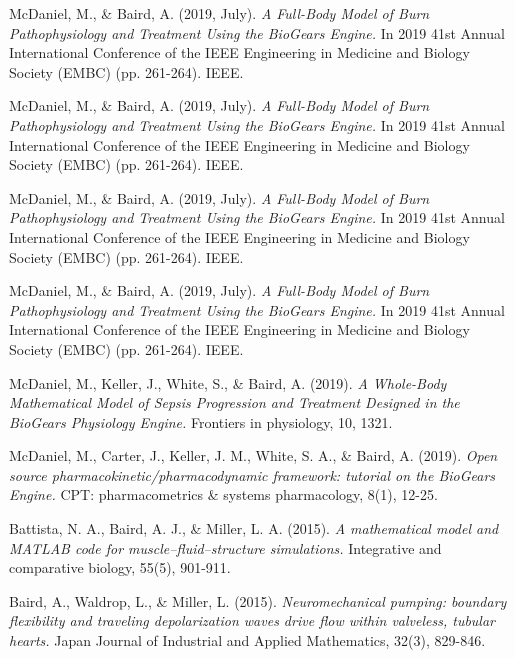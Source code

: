 
\begin{cventries}
  \cventry
    {} %
    {} %
    {} %
    {} %
    {
      \begin{cvitems} %
        \item {McDaniel, M., \& Baird, A. (2019, July). \textit{A Full-Body Model of Burn Pathophysiology and Treatment Using the BioGears Engine.} In 2019 41st Annual International Conference of the IEEE Engineering in Medicine and Biology Society (EMBC) (pp. 261-264). IEEE.}
        \item {McDaniel, M., \& Baird, A. (2019, July). \textit{A Full-Body Model of Burn Pathophysiology and Treatment Using the BioGears Engine.} In 2019 41st Annual International Conference of the IEEE Engineering in Medicine and Biology Society (EMBC) (pp. 261-264). IEEE.}
        \item {McDaniel, M., \& Baird, A. (2019, July). \textit{A Full-Body Model of Burn Pathophysiology and Treatment Using the BioGears Engine.} In 2019 41st Annual International Conference of the IEEE Engineering in Medicine and Biology Society (EMBC) (pp. 261-264). IEEE.}
        \item {McDaniel, M., \& Baird, A. (2019, July). \textit{A Full-Body Model of Burn Pathophysiology and Treatment Using the BioGears Engine.} In 2019 41st Annual International Conference of the IEEE Engineering in Medicine and Biology Society (EMBC) (pp. 261-264). IEEE.}
        \item {McDaniel, M., Keller, J., White, S., \& Baird, A. (2019). \textit{A Whole-Body Mathematical Model of Sepsis Progression and Treatment Designed in the BioGears Physiology Engine.} Frontiers in physiology, 10, 1321.}
        \item{McDaniel, M., Carter, J., Keller, J. M., White, S. A., \& Baird, A. (2019). \textit{Open source pharmacokinetic/pharmacodynamic framework: tutorial on the BioGears Engine.} CPT: pharmacometrics \& systems pharmacology, 8(1), 12-25.}
        \item{Battista, N. A., Baird, A. J., \& Miller, L. A. (2015). \textit{A mathematical model and MATLAB code for muscle–fluid–structure simulations.} Integrative and comparative biology, 55(5), 901-911.}
        \item{Baird, A., Waldrop, L., \& Miller, L. (2015). \textit{Neuromechanical pumping: boundary flexibility and traveling depolarization waves drive flow within valveless, tubular hearts.} Japan Journal of Industrial and Applied Mathematics, 32(3), 829-846.}

\end{cvitems}}
\end{cventries}
